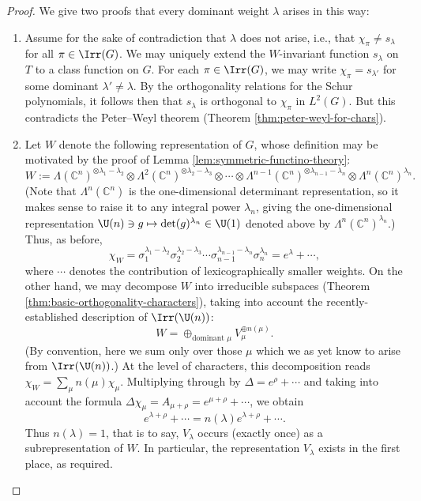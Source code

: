 \documentclass[reqno]{amsart} 
\begin{document}
\begin{proof}
  We give two proofs that every dominant weight $\lambda$ arises in this way:
  \begin{enumerate}
  \item Assume for the sake of contradiction that $\lambda$ does not arise, i.e., that $\chi_\pi \neq s_\lambda$ for all $\pi \in \Irr(G)$.  We may uniquely extend the $W$-invariant function $s_\lambda$ on $T$ to a class function on $G$.  For each $\pi \in \Irr(G)$, we may write $\chi_\pi = s_{\lambda '}$ for some dominant $\lambda ' \neq \lambda$.  By the orthogonality relations for the Schur polynomials, it follows then that $s_\lambda$ is orthogonal to $\chi_\pi$ in $L^2(G)$.  But this contradicts the Peter--Weyl theorem (Theorem \ref{thm:peter-weyl-for-chars}).
  \item Let $W$ denote the following representation of $G$, whose definition may be motivated by the proof of Lemma \ref{lem:symmetric-functino-theory}:
    \begin{equation*}
      W := \Lambda(\mathbb{C}^n)^{\otimes \lambda_1 - \lambda_2} \otimes \Lambda^2(\mathbb{C}^n) ^{\otimes \lambda_2 - \lambda_3} \otimes \dotsb \otimes \Lambda^{n-1}(\mathbb{C}^n)^{\otimes \lambda_{n-1}-\lambda_n} \otimes \Lambda^n(\mathbb{C}^n)^{\lambda_n}.
    \end{equation*}
    (Note that $\Lambda^n(\mathbb{C}^n)$ is the one-dimensional determinant representation, so it makes sense to raise it to any integral power $\lambda_n$, giving the one-dimensional representation $\U(n) \ni g \mapsto \det(g)^{\lambda_n} \in \U(1)$ denoted above by $\Lambda^n(\mathbb{C}^n)^{\lambda_n}$.)  Thus, as before,
    \begin{equation*}
      \chi_W = \sigma_1^{\lambda_1 - \lambda_2} \sigma_2^{\lambda_2 - \lambda_3} \dotsb \sigma_{n-1}^{\lambda_{n-1} - \lambda_n} \sigma_n^{\lambda_n} = e^\lambda + \dotsb,
    \end{equation*}
    where $\dotsb$ denotes the contribution of lexicographically smaller weights.  On the other hand, we may decompose $W$ into irreducible subspaces (Theorem \ref{thm:basic-orthogonality-characters}), taking into account the recently-established description of $\Irr(\U(n))$:
    \begin{equation*}
      W = \oplus_{\text{dominant }\mu} V_\mu^{\oplus n(\mu)}.
    \end{equation*}
    (By convention, here we sum only over those $\mu$ which we as yet know to arise from $\Irr(\U(n))$.)  At the level of characters, this decomposition reads $\chi_W = \sum_{\mu} n(\mu) \chi_\mu$.  Multiplying through by $\Delta = e^\rho + \dotsb$ and taking into account the formula $\Delta \chi_\mu = A_{\mu + \rho} = e^{\mu+\rho} + \dotsb$, we obtain
    \begin{equation*}
      e^{\lambda + \rho} + \dotsb = n(\lambda) e^{\lambda+\rho} + \dotsb.
    \end{equation*}
    Thus $n(\lambda) = 1$, that is to say, $V_\lambda$ occurs (exactly once) as a subrepresentation of $W$.  In particular, the representation $V_\lambda$ exists in the first place, as required.
    

\end{enumerate}
\end{proof}
\end{document}
